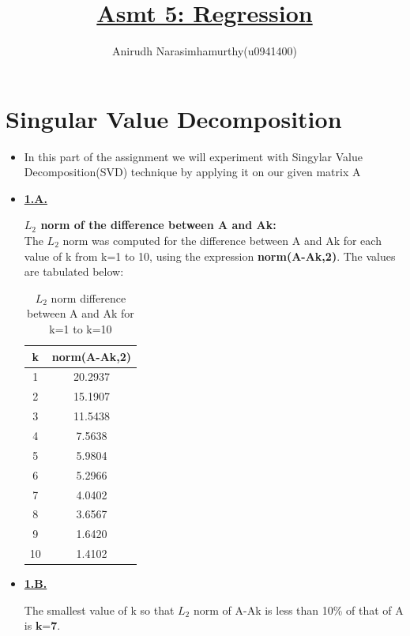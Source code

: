 \documentclass[11pt]{article}
\title{\textbf{\underline{Asmt 5: Regression}}}
\author{Anirudh Narasimhamurthy(u0941400)}
\begin{document}
\maketitle

\section{Singular Value Decomposition}

\begin{itemize}
	
	
	\item[] In this part of the assignment we will experiment with Singylar Value Decomposition(SVD) technique by applying it on our given matrix A
	
	\item[] \underline{\textbf{1.A.}}
	
	 \textbf{$L_2$ norm of the difference between A and Ak:}\\	
	 
	The $L_2$ norm was computed for the difference between A and Ak for each value of k from k=1 to 10, using the expression \textbf{norm(A-Ak,2)}. The values are tabulated below:
	
	\begin{table}[h]
		\centering
		\begin{tabular}{|c|c|}
			\hline
			\textbf{k}  & \textbf{norm(A-Ak,2)}\\
			\hline
			1 &  20.2937  \\
			\hline
			2 &  15.1907 \\
			\hline
			3 &  11.5438  \\
			\hline
			4 &  7.5638  \\
			\hline
			5 &  5.9804  \\
			\hline
			6 &  5.2966  \\
			\hline
			7 &  4.0402  \\
			\hline
			8 &  3.6567  \\
			\hline
			9 &  1.6420  \\
			\hline
		    10 &  1.4102  \\
		    \hline	
		\end{tabular}
		\caption{$L_2$ norm difference between A and Ak for k=1 to k=10 }
		\label{t2}
	\end{table}
	
	\item[] \underline{\textbf{1.B.}}
	
	The smallest value of k so that $L_2$ norm of A-Ak is less than 10\% of that of A is $\boxed{\textbf{k=7}}$.
	

\end{itemize}
\end{document}
